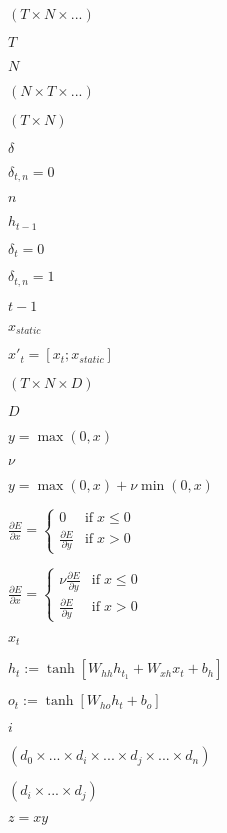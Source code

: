 \documentclass{article}
\begin{document}
$ (T \times N \times ...) $
\pagebreak

$ T $
\pagebreak

$ N $
\pagebreak

$ (N \times T \times ...) $
\pagebreak

$ (T \times N) $
\pagebreak

$ \delta $
\pagebreak

$ \delta_{t,n} = 0 $
\pagebreak

$ n $
\pagebreak

$ h_{t-1} $
\pagebreak

$ \delta_t = 0 $
\pagebreak

$ \delta_{t,n} = 1 $
\pagebreak

$ t-1 $
\pagebreak

$ x_{static} $
\pagebreak

$ x'_t = [x_t; x_{static}] $
\pagebreak

$ (T \times N \times D) $
\pagebreak

$ D $
\pagebreak

$ y = \max(0, x) $
\pagebreak

$ \nu $
\pagebreak

$ y = \max(0, x) + \nu \min(0, x) $
\pagebreak

$ \frac{\partial E}{\partial x} = \left\{ \begin{array}{lr} 0 & \mathrm{if} \; x \le 0 \\ \frac{\partial E}{\partial y} & \mathrm{if} \; x > 0 \end{array} \right. $
\pagebreak

$ \frac{\partial E}{\partial x} = \left\{ \begin{array}{lr} \nu \frac{\partial E}{\partial y} & \mathrm{if} \; x \le 0 \\ \frac{\partial E}{\partial y} & \mathrm{if} \; x > 0 \end{array} \right. $
\pagebreak

$ x_t $
\pagebreak

$ h_t := \tanh[ W_{hh} h_{t_1} + W_{xh} x_t + b_h ] $
\pagebreak

$ o_t := \tanh[ W_{ho} h_t + b_o ] $
\pagebreak

$ i $
\pagebreak

$ (d_0 \times ... \times d_i \times ... \times d_j \times ... \times d_n) $
\pagebreak

$ (d_i \times ... \times d_j) $
\pagebreak

$ z = x y $
\pagebreak
\end{document}
